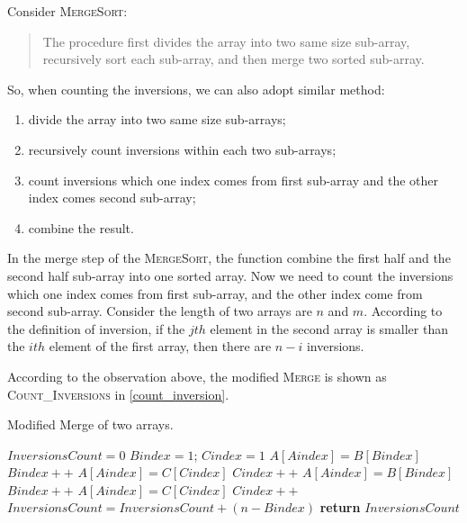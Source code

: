 \begin{homeworkProblem}[Inversions]

Consider \textsc{MergeSort}:

\begin{quote}
    The procedure first divides the array into two same size sub-array, recursively
    sort each sub-array, and then merge two sorted sub-array.
\end{quote}

So, when counting the inversions, we can also adopt similar method:
\begin{enumerate}
\item divide the array into two same size sub-arrays;
\item recursively count inversions within each two sub-arrays;
\item count inversions which one index comes from first sub-array and the other index comes
second sub-array;
\item combine the result.
\end{enumerate}

In the merge step of the \textsc{MergeSort}, the function combine the first half
and the second half sub-array into one sorted array. Now we need to count the
inversions which one index comes from first sub-array, and the other index come
from second sub-array. Consider the length of two arrays are $n$ and $m$.
According to the definition of inversion, if the $jth$ element in the second
array is smaller than the $ith$ element of the first array, then there are $n - i$
inversions.

According to the observation above, the modified \textsc{Merge} is shown as \textsc{Count\_Inversions} in \cref{count_inversion}.

\begin{algorithm}[H]
    \caption{Modified Merge of two arrays.} \label{count_inversion}
    \begin{algorithmic}[1]
        \State$InversionsCount = 0$
        \State$Bindex = 1$; $Cindex = 1$
             
                \State $A[Aindex]= B[Bindex]$
                \State $Bindex++$
             
                \State $A[Aindex] = C[Cindex]$
                \State $Cindex++$
             
                \State $A[Aindex] = B[Bindex]$
                \State $Bindex++$
            \Else {}
                \State $A[Aindex] = C[Cindex]$
                \State $Cindex++$
                \State $InversionsCount = InversionsCount + (n - Bindex)$
            \EndIf
        \EndFor
        \State \textbf{return } $InversionsCount$
        \EndProcedure
    \end{algorithmic}
\end{algorithm}


\end{homeworkProblem}
